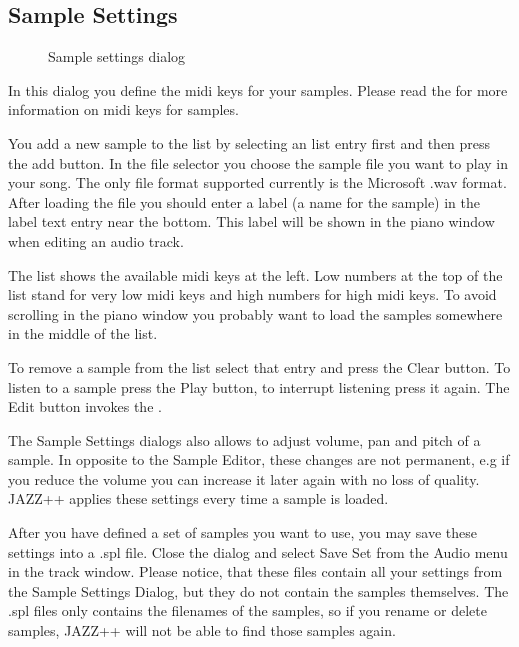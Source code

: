 \documentclass[letterpaper]{report}
\begin{document}
\subsection{Sample Settings}\label{samplesettings}

\begin{figure}%
%
%
\caption{Sample settings dialog}%
\end{figure}

In this dialog you define the midi keys for your samples. Please read
the  for more information on midi
keys for samples.

You add a new sample to the list by selecting an list entry first
and then press the add button. In the file selector you choose the
sample file you want to play in your song. The only file format supported
currently is the Microsoft .wav format. After loading the file you should
enter a label (a name for the sample) in the label text entry near the
bottom. This label will be shown in the piano window when editing an
audio track.

The list shows the available midi keys at the left. Low numbers at the
top of the list stand for very low midi keys and high numbers for high
midi keys. To avoid scrolling in the piano window you probably want to
load the samples somewhere in the middle of the list.

To remove a sample from the list select that entry and press the Clear
button. To listen to a sample press the Play button, to interrupt
listening press it again. The Edit button invokes the .

The Sample Settings dialogs also allows to adjust volume, pan and pitch
of a sample. In opposite to the Sample Editor, these changes are not
permanent, e.g if you reduce the volume you can increase it later again
with no loss of quality. JAZZ++ applies these settings every time a sample
is loaded.

After you have defined a set of samples you want to use, you may
save these settings into a .spl file. Close the dialog and select Save Set from the
Audio menu in the track window. Please notice, that these files contain all
your settings from the Sample Settings Dialog, but they do not contain
the samples themselves. The .spl files only contains the filenames of
the samples, so if you rename or delete samples, JAZZ++ will not be able
to find those samples again.
\end{document}
